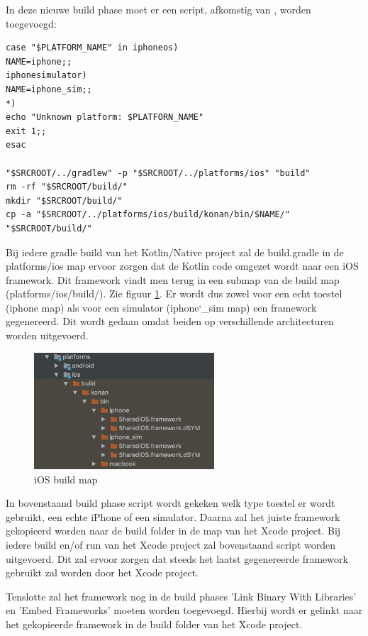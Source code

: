 In deze nieuwe build phase moet er een script, afkomstig van \textcite{AlbertGao}, worden toegevoegd: 
\begin{lstlisting}
case "$PLATFORM_NAME" in iphoneos)
NAME=iphone;;
iphonesimulator)
NAME=iphone_sim;;
*)
echo "Unknown platform: $PLATFORN_NAME"
exit 1;;
esac

"$SRCROOT/../gradlew" -p "$SRCROOT/../platforms/ios" "build"
rm -rf "$SRCROOT/build/"
mkdir "$SRCROOT/build/"
cp -a "$SRCROOT/../platforms/ios/build/konan/bin/$NAME/" "$SRCROOT/build/"
\end{lstlisting}

Bij iedere gradle build van het Kotlin/Native project zal de build.gradle in de platforms/ios map ervoor zorgen dat de Kotlin code omgezet wordt naar een iOS framework. Dit framework vindt men terug in een submap van de build map (platforms/ios/build/). Zie figuur \ref{fig:stap6-build}. Er wordt dus zowel voor een echt toestel (iphone map) als voor een simulator (iphone\char`_sim map) een framework gegenereerd. Dit wordt gedaan omdat beiden op verschillende architecturen worden uitgevoerd.

\begin{figure} [ht]
	\centering
	\includegraphics[width=0.60\textwidth]{img/stap6-build.png}
	\caption{iOS build map}
	\label{fig:stap6-build}
\end{figure}

In bovenstaand build phase script wordt gekeken welk type toestel er wordt gebruikt, een echte iPhone of een simulator. Daarna zal het juiste framework gekopieerd worden naar de build folder in de map van het Xcode project. Bij iedere build en/of run van het Xcode project zal bovenstaand script worden uitgevoerd. Dit zal ervoor zorgen dat steeds het laatst gegenereerde framework gebruikt zal worden door het Xcode project.

Tenslotte zal het framework nog in de build phases 'Link Binary With Libraries' en 'Embed Frameworks' moeten worden toegevoegd. Hierbij wordt er gelinkt naar het gekopieerde framework in de build folder van het Xcode project.

